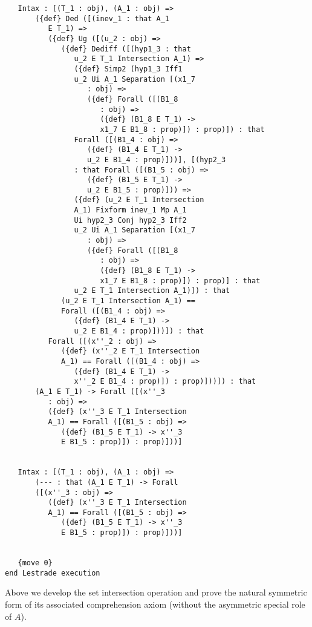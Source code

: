 \documentclass[12pt]{article}
\begin{document}
\begin{verbatim}
   Intax : [(T_1 : obj), (A_1 : obj) => 
       ({def} Ded ([(inev_1 : that A_1 
          E T_1) => 
          ({def} Ug ([(u_2 : obj) => 
             ({def} Dediff ([(hyp1_3 : that 
                u_2 E T_1 Intersection A_1) => 
                ({def} Simp2 (hyp1_3 Iff1 
                u_2 Ui A_1 Separation [(x1_7 
                   : obj) => 
                   ({def} Forall ([(B1_8 
                      : obj) => 
                      ({def} (B1_8 E T_1) -> 
                      x1_7 E B1_8 : prop)]) : prop)]) : that 
                Forall ([(B1_4 : obj) => 
                   ({def} (B1_4 E T_1) -> 
                   u_2 E B1_4 : prop)]))], [(hyp2_3 
                : that Forall ([(B1_5 : obj) => 
                   ({def} (B1_5 E T_1) -> 
                   u_2 E B1_5 : prop)])) => 
                ({def} (u_2 E T_1 Intersection 
                A_1) Fixform inev_1 Mp A_1 
                Ui hyp2_3 Conj hyp2_3 Iff2 
                u_2 Ui A_1 Separation [(x1_7 
                   : obj) => 
                   ({def} Forall ([(B1_8 
                      : obj) => 
                      ({def} (B1_8 E T_1) -> 
                      x1_7 E B1_8 : prop)]) : prop)] : that 
                u_2 E T_1 Intersection A_1)]) : that 
             (u_2 E T_1 Intersection A_1) == 
             Forall ([(B1_4 : obj) => 
                ({def} (B1_4 E T_1) -> 
                u_2 E B1_4 : prop)]))]) : that 
          Forall ([(x''_2 : obj) => 
             ({def} (x''_2 E T_1 Intersection 
             A_1) == Forall ([(B1_4 : obj) => 
                ({def} (B1_4 E T_1) -> 
                x''_2 E B1_4 : prop)]) : prop)]))]) : that 
       (A_1 E T_1) -> Forall ([(x''_3 
          : obj) => 
          ({def} (x''_3 E T_1 Intersection 
          A_1) == Forall ([(B1_5 : obj) => 
             ({def} (B1_5 E T_1) -> x''_3 
             E B1_5 : prop)]) : prop)]))]


   Intax : [(T_1 : obj), (A_1 : obj) => 
       (--- : that (A_1 E T_1) -> Forall 
       ([(x''_3 : obj) => 
          ({def} (x''_3 E T_1 Intersection 
          A_1) == Forall ([(B1_5 : obj) => 
             ({def} (B1_5 E T_1) -> x''_3 
             E B1_5 : prop)]) : prop)]))]


   {move 0}
end Lestrade execution
\end{verbatim}

Above we develop the set intersection operation and prove the natural symmetric form of its associated comprehension axiom (without the asymmetric special role of $A$).
\end{document}
